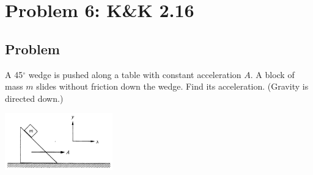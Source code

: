 \documentclass[solutions]{esg8012pset}
\begin{document}
\section*{Problem 6: K\&K 2.16}
\subsection*{Problem}
  A 45$^{\circ}$ wedge is pushed along a table with constant acceleration $A$. A block of mass $m$ slides without friction down the wedge. Find its acceleration. (Gravity is directed down.)
  \begin{center}\includegraphics[width=0.35\textwidth]{ps02_4}\end{center}
\end{document}
